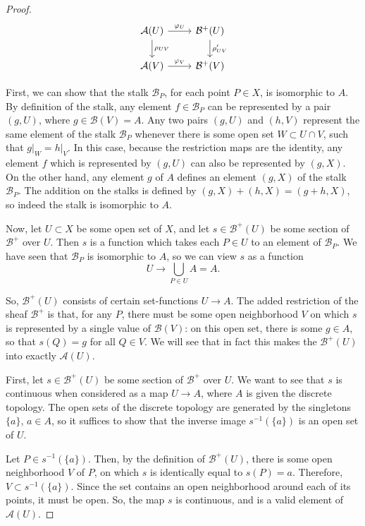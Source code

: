 \documentclass[12pt]{article}
\theoremstyle{definition}
\newenvironment{problem}[2][Problem]{\begin{trivlist}
\item[\hskip \labelsep {\bfseries #1}\hskip \labelsep {\bfseries #2.}]}{\end{trivlist}}
\begin{document}
\begin{problem}{1}
\begin{proof}
\[\begin{tikzcd}
\mathcal{A}(U) \arrow[r, "\varphi_U"] \arrow[d, "\rho_{UV}"] & \mathcal B^+(U) \arrow[d, "\rho'_{UV}"]\\
\mathcal A(V) \arrow[r, "\varphi_V"] &\mathcal B^+(V)
\end{tikzcd}
\]
\par First, we can show that the stalk $\mathcal B_P$, for each point $P \in X$, is isomorphic to $A$. By definition of the stalk, any element $f \in \mathcal B_P$ can be represented by a pair $(g,U)$, where $g \in \mathcal{B}(V) = A$. Any two pairs $(g,U)$ and $(h,V)$ represent the same element of the stalk $\mathcal B_P$ whenever there is some open set $W \subset U \cap V$, such that $g \lvert_W = h\lvert_V$. In this case, because the restriction maps are the identity, any element $f$ which is represented by $(g, U)$ can also be represented by $(g, X)$. On the other hand, any element $g$ of $A$ defines an element $(g,X)$ of the stalk $\mathcal B_P$. The addition on the stalks is defined by $(g,X) + (h, X) = (g + h, X)$, so indeed the stalk is isomorphic to $A$.
\par Now, let $U \subset X$ be some open set of $X$, and let $s \in \mathcal B^+(U)$ be some section of $\mathcal B^+$ over $U$. Then $s$ is a function which takes each $P \in U$ to an element of $\mathcal B_P$. We have seen that $\mathcal B_P$ is isomorphic to $A$, so we can view $s$ as a function 
\[U \to \bigcup_{P \in U} A = A.\]
\par So, $\mathcal B^+(U)$ consists of certain set-functions $U \to A$. The added restriction of the sheaf $\mathcal B^+$ is that, for any $P$, there must be some open neighborhood $V$ on which $s$ is represented by a single value of $\mathcal B(V)$: on this open set, there is some $g \in A$, so that $s(Q) = g$ for all $Q \in V$. We will see that in fact this makes the $\mathcal B^+(U)$ into exactly $\mathcal A(U)$.
\par First, let $s \in \mathcal B^+(U)$ be some section of $\mathcal B^+$ over $U$. We want to see that $s$ is continuous when considered as a map $U \to A$, where $A$ is given the discrete topology. The open sets of the discrete topology are generated by the singletons $\{a\}$, $a \in A$, so it suffices to show that the inverse image $s^{-1}(\{a\})$ is an open set of $U$.
\par Let $P \in s^{-1}(\{a\})$. Then, by the definition of $\mathcal B^+(U)$, there is some open neighborhood $V$ of $P$, on which $s$ is identically equal to $s(P) = a$. Therefore, $V \subset s^{-1}(\{a\})$. Since the set contains an open neighborhood around each of its points, it must be open. So, the map $s$ is continuous, and is a valid element of $\mathcal A(U)$.

\end{proof}
\end{problem}
\end{document}
